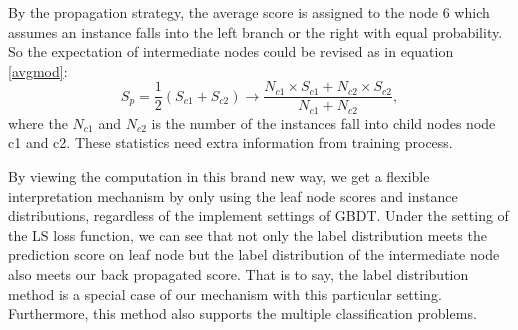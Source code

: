 By the propagation strategy, the average score is assigned to the node 6 which assumes  an instance 
falls into the left branch or the right with equal probability. So the expectation of intermediate nodes could be revised 
as in equation \ref{avgmod}:
\begin{equation}  \label{avgmod}
S_{p}=\frac{1}{2}(S_{c1}+S_{c2})\rightarrow\frac{N_{c1}\times S_{c1}+N_{c2}\times S_{c2}}{N_{c1}+N_{c2}},
\end{equation}  
where the $N_{c1}$ and $N_{c2}$ is the number of the instances fall into child nodes node c1 and c2.
These statistics need extra information from training process.

By viewing the computation in this brand new way, 
we get a  flexible interpretation mechanism by only using the leaf
node scores and instance distributions, regardless of the implement settings of GBDT.  Under the setting of
the LS loss function, we can see that not only the label distribution meets the 
prediction score on leaf node but the
label distribution of the intermediate node also meets our back propagated score. 
That is to say, the label distribution
method is a special case of our mechanism with this particular setting. Furthermore,
this method also supports the multiple classification problems.

